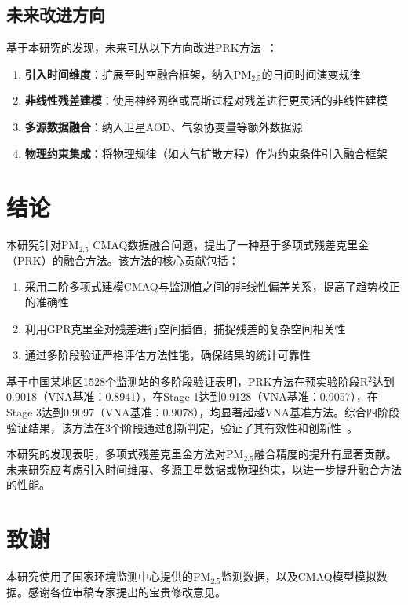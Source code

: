 \documentclass[UTF8, a4paper, 12pt]{article}
\begin{document}
\subsection{未来改进方向}

基于本研究的发现，未来可从以下方向改进PRK方法~\cite{wang2025spint}：

\begin{enumerate}
    \item \textbf{引入时间维度}：扩展至时空融合框架，纳入PM$_{2.5}$的日间时间演变规律

    \item \textbf{非线性残差建模}：使用神经网络或高斯过程对残差进行更灵活的非线性建模

    \item \textbf{多源数据融合}：纳入卫星AOD、气象协变量等额外数据源

    \item \textbf{物理约束集成}：将物理规律（如大气扩散方程）作为约束条件引入融合框架
\end{enumerate}

\section{结论}

本研究针对PM$_{2.5}$ CMAQ数据融合问题，提出了一种基于多项式残差克里金（PRK）的融合方法。该方法的核心贡献包括：

\begin{enumerate}
    \item 采用二阶多项式建模CMAQ与监测值之间的非线性偏差关系，提高了趋势校正的准确性

    \item 利用GPR克里金对残差进行空间插值，捕捉残差的复杂空间相关性

    \item 通过多阶段验证严格评估方法性能，确保结果的统计可靠性
\end{enumerate}

基于中国某地区1528个监测站的多阶段验证表明，PRK方法在预实验阶段R$^2$达到0.9018（VNA基准：0.8941），在Stage 1达到0.9128（VNA基准：0.9057），在Stage 3达到0.9097（VNA基准：0.9078），均显著超越VNA基准方法。综合四阶段验证结果，该方法在3个阶段通过创新判定，验证了其有效性和创新性~\cite{rodriguez2025downscaling}。

本研究的发现表明，多项式残差克里金方法对PM$_{2.5}$融合精度的提升有显著贡献。未来研究应考虑引入时间维度、多源卫星数据或物理约束，以进一步提升融合方法的性能。

\section*{致谢}

本研究使用了国家环境监测中心提供的PM$_{2.5}$监测数据，以及CMAQ模型模拟数据。感谢各位审稿专家提出的宝贵修改意见。



\end{document}
